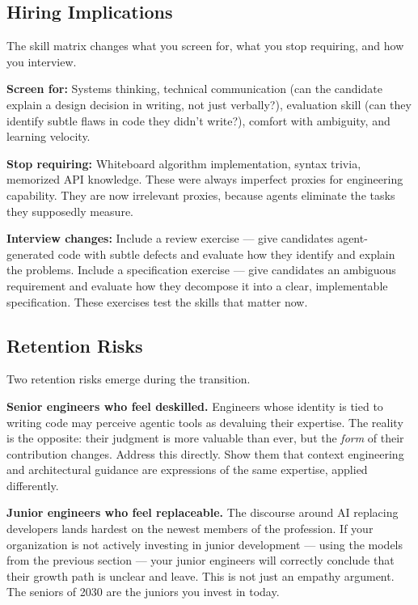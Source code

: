 \documentclass[
  a4paper,
  DIV=11,
  numbers=noendperiod]{scrreprt}
\begin{document}
\subsection{Hiring Implications}\label{hiring-implications}

The skill matrix changes what you screen for, what you stop requiring,
and how you interview.

\textbf{Screen for:} Systems thinking, technical communication (can the
candidate explain a design decision in writing, not just verbally?),
evaluation skill (can they identify subtle flaws in code they didn't
write?), comfort with ambiguity, and learning velocity.

\textbf{Stop requiring:} Whiteboard algorithm implementation, syntax
trivia, memorized API knowledge. These were always imperfect proxies for
engineering capability. They are now irrelevant proxies, because agents
eliminate the tasks they supposedly measure.

\textbf{Interview changes:} Include a review exercise --- give
candidates agent-generated code with subtle defects and evaluate how
they identify and explain the problems. Include a specification exercise
--- give candidates an ambiguous requirement and evaluate how they
decompose it into a clear, implementable specification. These exercises
test the skills that matter now.

\subsection{Retention Risks}\label{retention-risks}

Two retention risks emerge during the transition.

\textbf{Senior engineers who feel deskilled.} Engineers whose identity
is tied to writing code may perceive agentic tools as devaluing their
expertise. The reality is the opposite: their judgment is more valuable
than ever, but the \emph{form} of their contribution changes. Address
this directly. Show them that context engineering and architectural
guidance are expressions of the same expertise, applied differently.

\textbf{Junior engineers who feel replaceable.} The discourse around AI
replacing developers lands hardest on the newest members of the
profession. If your organization is not actively investing in junior
development --- using the models from the previous section --- your
junior engineers will correctly conclude that their growth path is
unclear and leave. This is not just an empathy argument. The seniors of
2030 are the juniors you invest in today.
\end{document}
